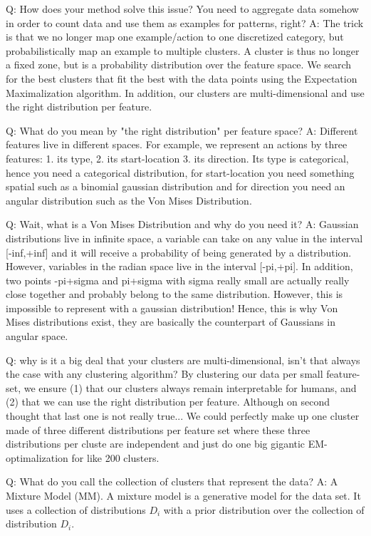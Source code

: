 \documentclass[runningheads]{llncs}
\begin{document}
Q: How does your method solve this issue? You need to aggregate data somehow in order to count data and use them as examples for patterns, right?
A: The trick is that we no longer map one example/action to one discretized category, but probabilistically map an example to multiple clusters. A cluster is thus no longer a fixed zone, but is a probability distribution over the feature space. We search for the best clusters that fit the best with the data points using the Expectation Maximalization algorithm. In addition, our clusters are multi-dimensional and use the right distribution per feature.

Q: What do you mean by "the right distribution" per feature space?
A: Different features live in different spaces. For example, we represent an actions by three features: 1. its type, 2. its start-location 3. its direction. Its type is categorical, hence you need a categorical distribution, for start-location you need something spatial such as a binomial gaussian distribution and for direction you need an angular distribution such as the Von Mises Distribution.

Q: Wait, what is a Von Mises Distribution and why do you need it?
A: Gaussian distributions live in infinite space, a variable can take on any value in the interval [-inf,+inf] and it will receive a probability of being generated by a distribution. However, variables in the radian space live in the interval [-pi,+pi]. In addition, two points -pi+sigma and pi+sigma with sigma really small are actually really close together and probably belong to the same distribution. However, this is impossible to represent with a gaussian distribution! Hence, this is why Von Mises distributions exist, they are basically the counterpart of Gaussians in angular space.

Q: why is it a big deal that your clusters are multi-dimensional, isn't that always the case with any clustering algorithm?
By clustering our data per small feature-set, we ensure (1) that our clusters always remain interpretable for humans, and (2) that we can use the right distribution per feature. Although on second thought that last one is not really true... We could perfectly make up one cluster made of three different distributions per feature set where these three distributions per cluste are independent and just do one big gigantic EM-optimalization for like 200 clusters.

Q: What do you call the collection of clusters that represent the data?
A: A  Mixture Model (MM). A mixture model is a generative model for the data set. It uses a collection of distributions $D_i$ with a prior distribution over the collection of distribution $D_i$.

 
\end{document}
